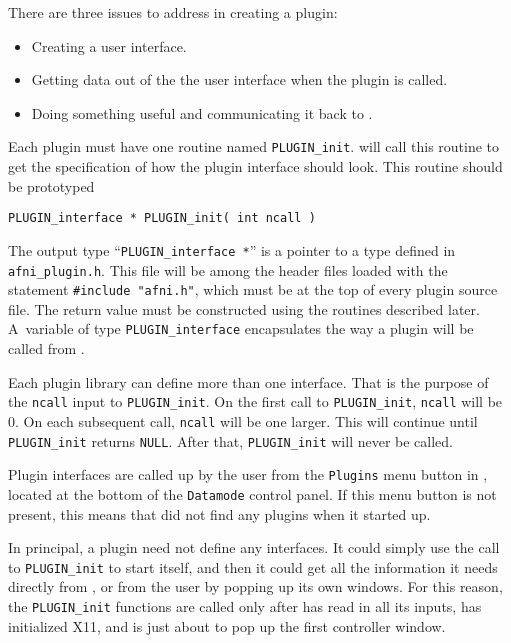 \label{CreatingPlugin}
There are three issues to address in creating a plugin:
\begin{itemize}
  \item Creating a user interface.
  \item Getting data out of the the user interface when the plugin is called.
  \item Doing something useful and communicating it back to \afni.
\end{itemize}
Each plugin must have one routine named {\tt PLUGIN\_init}.
\afnit will call this routine to get the specification of how the
plugin interface should look.  This routine should be prototyped\vspace{2ex}

\noindent
\centerline{\tt PLUGIN\_interface * PLUGIN\_init( int ncall )}\vspace{2ex}
The output type ``{\tt PLUGIN\_interface *}'' is a pointer to a type defined
in {\tt afni\_plugin.h}.  This file will be among the header files
loaded with the statement {\tt \#include~"afni.h"}, which must be
at the top of every plugin source file.
The return value must be constructed using the routines described
later.  A~variable of type {\tt PLUGIN\_interface} encapsulates the way
a plugin will be called from \afni.

Each plugin library can define more than one interface.  That is the purpose of
the {\tt ncall} input to {\tt PLUGIN\_init}.
On the first call to {\tt PLUGIN\_init}, {\tt ncall}
will be~$0$.  On each subsequent call, {\tt ncall} will be one larger.
This will continue until {\tt PLUGIN\_init} returns {\tt NULL}.  After
that, {\tt PLUGIN\_init} will never be called.

Plugin interfaces are called up by the user from the {\tt Plugins} menu button in \afni,
located at the bottom of the {\tt Datamode} control panel.
If this menu button is not present, this means that \afnit did not
find any plugins when it started up.

In principal, a plugin need not define any interfaces.  It could simply
use the call to {\tt PLUGIN\_init} to start itself, and then it could
get all the information it needs directly from \afni, or from the user
by popping up its own windows.  For this reason, the {\tt PLUGIN\_init} functions are
called only after \afnit has read in all its inputs, has initialized X11,
and is just about to pop up the first controller window.

